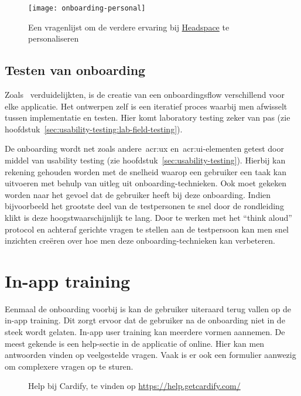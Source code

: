 \begin{figure}[h!]
    \centering
    \texttt{[image: onboarding-personal]}
    \caption[Voorbeeld gepersonaliseerde onboarding]{Een vragenlijst om de verdere ervaring bij \href{https://www.headspace.com/}{Headspace} te personaliseren}
    \label{fig:onboarding:gepersonaliseerd}
\end{figure}

\subsection{Testen van onboarding}
\label{sec:onboarding:testen}

Zoals~\textcite{Strahm2018} verduidelijkten, is de creatie van een onboardingsflow verschillend voor elke applicatie. Het ontwerpen zelf is een iteratief proces waarbij men afwisselt tussen implementatie en testen. Hier komt laboratory testing zeker van pas (zie hoofdstuk~\ref{sec:usability-testing:lab-field-testing}).

De onboarding wordt net zoals andere~\acrshort{acr:ux} en~\acrshort{acr:ui}-elementen getest door middel van usability testing (zie hoofdstuk~\ref{sec:usability-testing}). Hierbij kan rekening gehouden worden met de snelheid waarop een gebruiker een taak kan uitvoeren met behulp van uitleg uit onboarding-technieken. Ook moet gekeken worden naar het gevoel dat de gebruiker heeft bij deze onboarding. Indien bijvoorbeeld het grootste deel van de testpersonen te snel door de rondleiding klikt is deze hoogstwaarschijnlijk te lang. Door te werken met het ``think aloud'' protocol en achteraf gerichte vragen te stellen aan de testpersoon kan men snel inzichten creëren over hoe men deze onboarding-technieken kan verbeteren.

\section{In-app training}
\label{sec:in-app-training}

Eenmaal de onboarding voorbij is kan de gebruiker uiteraard terug vallen op de in-app training. Dit zorgt ervoor dat de gebruiker na de onboarding niet in de steek wordt gelaten. In-app user training kan meerdere vormen aannemen. De meest gekende is een help-sectie in de applicatie of online. Hier kan men antwoorden vinden op veelgestelde vragen. Vaak is er ook een formulier aanwezig om complexere vragen op te sturen.

\begin{figure}
    \centering
    \qquad
    \caption[Voorbeeld help-sectie]{Help bij Cardify, te vinden op \url{https://help.getcardify.com/}}
    \label{fig:inapptraining:help}
\end{figure}

